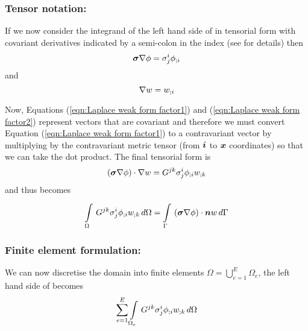 \subsubsection{Tensor notation:}
If we now consider the integrand of the left hand side of
 in tensorial form with covariant
derivatives indicated by a semi-colon in the index
(see  for details) then
\begin{equation}
  \boldsymbol{\sigma}\nabla \phi = \sigma^{i}_{j} {\phi}_{;i} 
  \label{eqn:Laplace weak form factor1}
\end{equation}
and
\begin{equation}
  \nabla w =  {w}_{;i} 
  \label{eqn:Laplace weak form factor2}
\end{equation}

Now, Equations (\ref{eqn:Laplace weak form factor1}) and (\ref{eqn:Laplace weak form factor2})
represent vectors that are covariant and
therefore we must convert Equation (\ref{eqn:Laplace weak form factor1})
to a contravariant vector by 
multiplying by the contravariant metric tensor (from $\vect{i}$ to $\vect{x}$ 
coordinates) so that we can take the dot product. The final tensorial form is
\begin{equation}
  \left( \boldsymbol{\sigma}\nabla \phi \right)\cdot\nabla w = G^{jk}\sigma^{i}_{j} {\phi}_{;i}  {w}_{;k} 
\end{equation}
and thus  becomes
\begin{equation}
  \gint{\Omega}{}{G^{jk}\sigma^{i}_{j}\covarderiv{\phi}{i}\covarderiv{w}{k}}{\Omega}
  = \gint{\Gamma}{}{\dotprod{\pbrac{\tensor{\sigma}\gradient{\phi}}}{\vect{n}w}}{\Gamma}
  \label{eqn:Laplaceweightedresidualtensorform}
\end{equation}

\subsubsection{Finite element formulation:}
We can now discretise the domain into finite elements \ie $\Omega=
\displaystyle{\bigcup_{e=1}^{E}}\Omega_{e}$, the left hand side of
 becomes
\begin{equation}
  \displaystyle\sum_{e=1}^{E}  \displaystyle\int\limits_{\Omega_{e}}^{} \,G^{jk}\sigma^{i}_{j} {\phi}_{;i}  {w}_{;k} \,d\Omega 
\end{equation}

